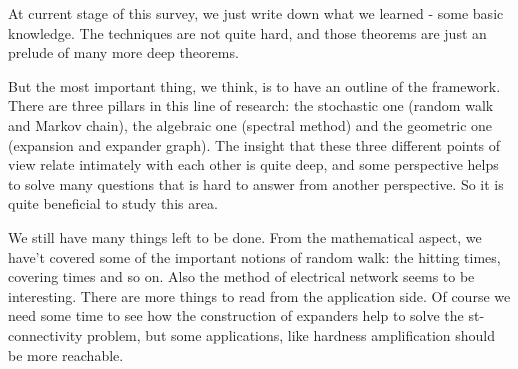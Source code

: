 At current stage of this survey, we just write down what we learned
- some basic knowledge. The techniques are not quite hard, and those
theorems are just an prelude of many more deep theorems.

But the most important thing, we think, is to have an outline of the
framework. There are three pillars in this line of research: the
stochastic one (random walk and Markov chain), the algebraic one
(spectral method) and the geometric one (expansion and expander
graph). The insight that these three different points of view relate
intimately with each other is quite deep, and some perspective helps
to solve many questions that is hard to answer from another
perspective. So it is quite beneficial to study this area.

We still have many things left to be done. From the mathematical
aspect, we have't covered some of the important notions of random
walk: the hitting times, covering times and so on. Also the method
of electrical network seems to be interesting. There are more things
to read from the application side. Of course we need some time to
see how the construction of expanders help to solve the
st-connectivity problem, but some applications, like hardness
amplification should be more reachable.
